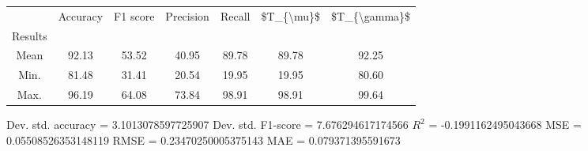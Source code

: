 \begin{tabular}{|c|c|c|c|c|c|c|}
\toprule
{} &  Accuracy &  F1 score &  Precision &  Recall &  \$T\_\{\textbackslash mu\}\$ &  \$T\_\{\textbackslash gamma\}\$ \\
Results &           &           &            &         &            &               \\
\hline
Mean    &     92.13 &     53.52 &      40.95 &   89.78 &      89.78 &         92.25 \\
Min.    &     81.48 &     31.41 &      20.54 &   19.95 &      19.95 &         80.60 \\
Max.    &     96.19 &     64.08 &      73.84 &   98.91 &      98.91 &         99.64 \\
\bottomrule
\end{tabular}

 Dev. std. accuracy = 3.1013078597725907
 Dev. std. F1-score = 7.676294617174566
 $R^2$ = -0.1991162495043668
 MSE = 0.05508526353148119
 RMSE = 0.23470250005375143
 MAE = 0.079371395591673